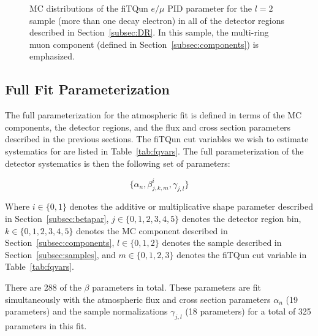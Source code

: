 \begin{figure}[h!]
\begin{tabular}{l  l  l}
\end{tabular} 
\caption{MC distributions of the fiTQun $e/\mu$ PID parameter for the $l=2$ 
sample (more than one decay electron) in all of the detector regions described in
Section~\ref{subsec:DR}.  In this sample, the multi-ring muon component
(defined in Section~\ref{subsec:components}) is emphasized.}
\label{fig:samplot2}
\end{figure}
\FloatBarrier




\subsection{Full Fit Parameterization}
\label{subsec:fullpars}

The full parameterization for the atmospheric fit is defined in terms of the MC
components, the detector regions, and the flux and cross section parameters
described in the previous sections.  The fiTQun cut variables we wish to
estimate systematics for are listed in Table~\ref{tab:fqvars}. The full
parameterization of the detector systematics is then the following set of
parameters:

\begin{equation}
  \label{eq:fullpars}
  \{\alpha_{n}, \beta_{j,k,m}^{i}, \gamma_{j,l} \}
\end{equation}

Where $i \in \{0,1\}$ denotes the additive or multiplicative shape parameter
described in Section~\ref{subsec:betapar}, $j \in \{0,1,2,3,4,5\}$ denotes the
detector region bin, $k \in \{0,1,2,3,4,5\}$ denotes the MC component described
in Section~\ref{subsec:components},  $l \in \{0,1,2\}$ denotes the sample
described in Section~\ref{subsec:samples}, and $m \in \{0,1,2,3\}$ denotes the
fiTQun cut variable in Table~\ref{tab:fqvars}. 

There are 288 of the $\beta$ parameters in total.  These parameters are fit
simultaneously with the atmospheric flux and cross section parameters
$\alpha_{n}$ (19 parameters) and the sample normalizations $\gamma_{j,l}$ (18
parameters) for a total of 325 parameters in this fit.




